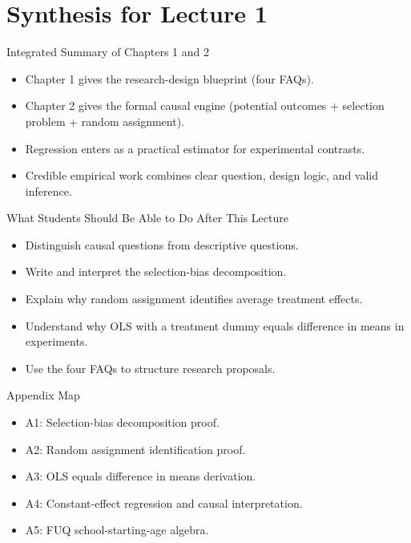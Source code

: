 \documentclass[11pt,aspectratio=169]{beamer}
\begin{document}
\section{Synthesis for Lecture 1}

\begin{frame}{Integrated Summary of Chapters 1 and 2}
  \begin{itemize}
    \item Chapter 1 gives the research-design blueprint (four FAQs).
    \item Chapter 2 gives the formal causal engine (potential outcomes + selection problem + random assignment).
    \item Regression enters as a practical estimator for experimental contrasts.
    \item Credible empirical work combines clear question, design logic, and valid inference.
  \end{itemize}
\end{frame}

\begin{frame}{What Students Should Be Able to Do After This Lecture}
  \begin{itemize}
    \item Distinguish causal questions from descriptive questions.
    \item Write and interpret the selection-bias decomposition.
    \item Explain why random assignment identifies average treatment effects.
    \item Understand why OLS with a treatment dummy equals difference in means in experiments.
    \item Use the four FAQs to structure research proposals.
  \end{itemize}
\end{frame}

\appendix

\begin{frame}{Appendix Map}
  \begin{itemize}
    \item A1: Selection-bias decomposition proof.
    \item A2: Random assignment identification proof.
    \item A3: OLS equals difference in means derivation.
    \item A4: Constant-effect regression and causal interpretation.
    \item A5: FUQ school-starting-age algebra.
  \end{itemize}
\end{frame}
\end{document}
